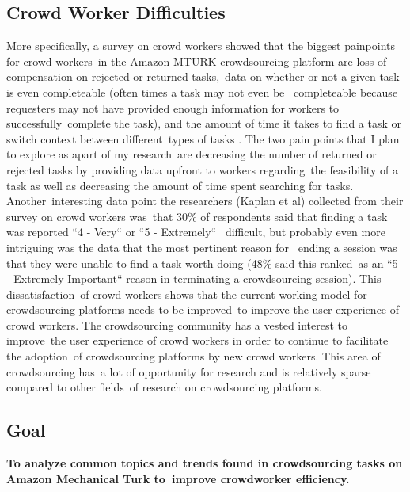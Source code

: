 \documentclass[letterpaper,12pt]{article}
\begin{document}
\subsection{Crowd Worker Difficulties}
More specifically, a survey on crowd workers showed that the biggest painpoints for crowd workers\
in the Amazon MTURK crowdsourcing platform are loss of compensation on rejected or returned tasks,\
data on whether or not a given task is even completeable (often times a task may not even be \
completeable because requesters may not have provided enough information for workers to successfully\
complete the task), and the amount of time it takes to find a task or switch context between different\
types of tasks \cite{Kaplan2018}. The two pain points that I plan to explore as apart of my research\
are decreasing the number of returned or rejected tasks by providing data upfront to workers regarding\
the feasibility of a task as well as decreasing the amount of time spent searching for tasks. Another\
interesting data point the researchers (Kaplan et al) collected from their survey on crowd workers was\
that 30\% of respondents said that finding a task was reported ``4 - Very`` or ``5 - Extremely`` \
difficult, but probably even more intriguing was the data that the most pertinent reason for \
ending a session was that they were unable to find a task worth doing (48\% said this ranked\
as an ``5 - Extremely Important`` reason in terminating a crowdsourcing session). \cite{Kaplan2018} This dissatisfaction\
of crowd workers shows that the current working model for crowdsourcing platforms needs to be improved\
to improve the user experience of crowd workers. The crowdsourcing community has a vested interest to improve\
the user experience of crowd workers in order to continue to facilitate the adoption\
of crowdsourcing platforms by new crowd workers. This area of crowdsourcing has\
a lot of opportunity for research and is relatively sparse compared to other fields\
of research on crowdsourcing platforms.

\subsection{Goal}
\textbf{To analyze common topics and trends found in crowdsourcing tasks on Amazon Mechanical Turk to\
 improve crowdworker efficiency.}
\end{document}
